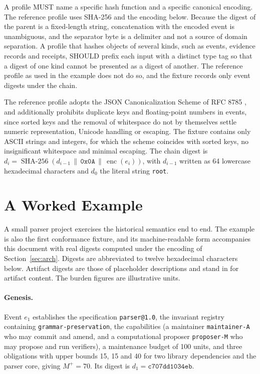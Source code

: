 \documentclass[11pt]{article}
\theoremstyle{remark}
\begin{document}
A profile MUST name a specific hash function and a specific canonical encoding. The reference profile uses SHA-256 and the encoding below. Because the digest of the parent is a fixed-length string, concatenation with the encoded event is unambiguous, and the separator byte is a delimiter and not a source of domain separation. A profile that hashes objects of several kinds, such as events, evidence records and receipts, SHOULD prefix each input with a distinct type tag so that a digest of one kind cannot be presented as a digest of another. The reference profile as used in the example does not do so, and the fixture records only event digests under the chain.

The reference profile adopts the JSON Canonicalization Scheme of RFC 8785 \cite{rfc8785}, and additionally prohibits duplicate keys and floating-point numbers in events, since sorted keys and the removal of whitespace do not by themselves settle numeric representation, Unicode handling or escaping. The fixture contains only ASCII strings and integers, for which the scheme coincides with sorted keys, no insignificant whitespace and minimal escaping. The chain digest is $d_i=\operatorname{SHA\text{-}256}(d_{i-1}\,\|\,\texttt{0x0A}\,\|\,\operatorname{enc}(e_i))$, with $d_{i-1}$ written as 64 lowercase hexadecimal characters and $d_0$ the literal string \texttt{root}.

\section{A Worked Example}\label{sec:example}

A small parser project exercises the historical semantics end to end. The example is also the first conformance fixture, and its machine-readable form accompanies this document with real digests computed under the encoding of Section~\ref{sec:arch}. Digests are abbreviated to twelve hexadecimal characters below. Artifact digests are those of placeholder descriptions and stand in for artifact content. The burden figures are illustrative units.

\paragraph{Genesis.} Event $e_1$ establishes the specification \texttt{parser@1.0}, the invariant registry containing \texttt{grammar-preservation}, the capabilities (a maintainer \texttt{maintainer-A} who may commit and amend, and a computational proposer \texttt{proposer-M} who may propose and run verifiers), a maintenance budget of 100 units, and three obligations with upper bounds 15, 15 and 40 for two library dependencies and the parser core, giving $M^{+}=70$. Its digest is $d_1=\texttt{c707dd1034eb}$.
\end{document}
